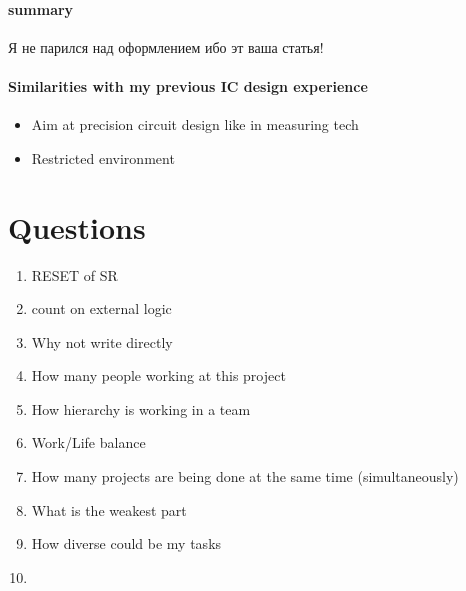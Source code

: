 \documentclass[a4paper,12pt]{article} %
\begin{document}
\paragraph{summary} Я не парился над оформлением ибо эт ваша статья!


\paragraph{Similarities with my previous IC design experience}
\begin{itemize}
    \item Aim at precision circuit design like in measuring tech
    \item Restricted environment
\end{itemize}

\section{Questions}

\begin{enumerate}
    \item RESET of SR
    \item count on external logic
    \item Why not write directly
    \item How many people working at this project
    \item How hierarchy is working in a team
    \item Work/Life balance
    \item How many projects are being done at the same time (simultaneously)
    \item What is the weakest part
    \item How diverse could be my tasks
    \item 
\end{enumerate}
\end{document}
